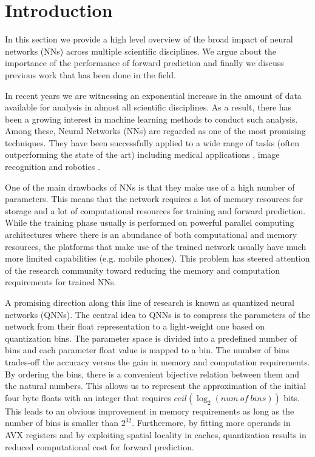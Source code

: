 
\section{Introduction}\label{sec:intro}
In this section we provide a high level overview of the broad impact of neural networks (NNs) across multiple scientific disciplines. We argue about the importance of the performance of forward prediction and finally we discuss previous work that has been done in the field.

 In recent years we are witnessing an exponential increase in the amount of data available for analysis in almost all scientific disciplines. As a result, there has been a growing interest in machine learning methods to conduct such analysis. Among these, Neural Networks (NNs) are regarded as one of the most promising techniques. 
They have been successfully applied to a wide range of tasks (often outperforming the state of the art) including medical applications \cite{amato_artificial_2013}, image recognition \cite{krizhevsky_imagenet_2012} and robotics \cite{gu_deep_2016}. 

One of the main drawbacks of NNs is that they make use of a high number of parameters. This means that the network requires a lot of memory resources for storage and a lot of computational resources for training and forward prediction. While the training phase usually is performed on powerful parallel computing architectures where there is an abundance of both computational and memory resources, the platforms that make use of the trained network usually have much more limited capabilities (e.g. mobile phones). This problem has steered attention of the research community toward reducing the memory and computation requirements for trained NNs.

A promising direction along this line of research is known as quantized neural networks (QNNs). The central idea to QNNs is to compress the parameters of the network from their float representation to a light-weight one based on quantization bins. The parameter space is divided into a predefined number of bins and each parameter float value is mapped to a bin. The number of bins trades-off the accuracy versus the gain in memory and computation requirements. By ordering the bins, there is a convenient bijective relation between them and the natural numbers. This allows us to represent the approximation of the initial four byte floats with an integer that requires $ceil(\log_2({num~of~bins}))$ bits. This leads to an obvious improvement in memory requirements as long as the number of bins is smaller than $2^{32}$. Furthermore, by fitting more operands in AVX registers and by exploiting spatial locality in caches, quantization results in reduced computational cost for forward prediction.

